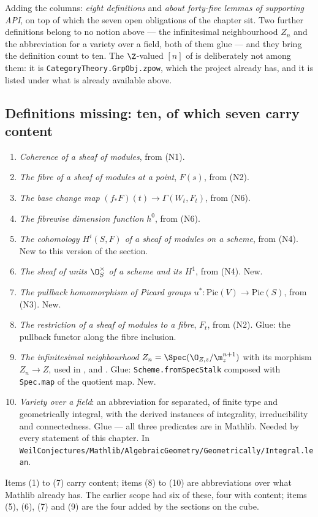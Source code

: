 Adding the columns: \emph{eight definitions} and \emph{about forty-five lemmas
of supporting API}, on top of which the seven open obligations of the chapter
sit.  Two further definitions belong to no notion above --- the infinitesimal
neighbourhood $Z_n$ and the abbreviation for a variety over a field, both of
them glue --- and they bring the definition count to ten.  The $\Z$-valued
$[n]$ of  is deliberately not among them: it is
\texttt{CategoryTheory.GrpObj.zpow}, which the project already has, and it is
listed under what is already available above.

\subsection*{Definitions missing: ten, of which seven carry content}

\begin{enumerate}
  \item \emph{Coherence of a sheaf of modules}, from (N1).
  \item \emph{The fibre of a sheaf of modules at a point}, $F(s)$, from (N2).
  \item \emph{The base change map} $(f_*F)(t)\to\Gamma(W_t,F_t)$, from (N6).
  \item \emph{The fibrewise dimension function} $h^0$, from (N6).
  \item \emph{The cohomology $H^i(S,F)$ of a sheaf of modules on a scheme},
  from (N4).  New to this version of the section.
  \item \emph{The sheaf of units $\O_S^\times$ of a scheme and its $H^1$},
  from (N4).  New.
  \item \emph{The pullback homomorphism of Picard groups}
  $u^*\colon\mathrm{Pic}(V)\to\mathrm{Pic}(S)$, from (N3).  New.
  \item \emph{The restriction of a sheaf of modules to a fibre}, $F_t$, from
  (N2).  Glue: the pullback functor along the fibre inclusion.
  \item \emph{The infinitesimal neighbourhood}
  $Z_n=\Spec(\O_{Z,z}/\m_z^{n+1})$ with its morphism $Z_n\to Z$, used in
  ,  and
  .  Glue: \texttt{Scheme.fromSpecStalk} composed with
  \texttt{Spec.map} of the quotient map.  New.
  \item \emph{Variety over a field}: an abbreviation for separated, of finite
  type and geometrically integral, with the derived instances of integrality,
  irreducibility and connectedness.  Glue --- all three predicates are in
  Mathlib.  Needed by every statement of this chapter.  In
  \texttt{WeilConjectures/Mathlib/AlgebraicGeometry/Geometrically/Integral.lean}.
\end{enumerate}
Items (1) to (7) carry content; items (8) to (10) are abbreviations over what
Mathlib already has.  The earlier scope had six of these, four with content;
items (5), (6), (7) and (9) are the four added by the sections on the cube.

